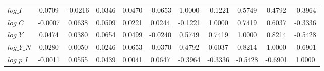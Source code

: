 \begin{center}
\begin{longtable}{lcccccccccc}
$log\_I          $	 & 	            0.0709	 & 	           -0.0216	 & 	            0.0346	 & 	            0.0470	 & 	           -0.0653	 & 	            1.0000	 & 	           -0.1221	 & 	            0.5749	 & 	            0.4792	 & 	           -0.3964 \\ 
$log\_C          $	 & 	           -0.0007	 & 	            0.0638	 & 	            0.0509	 & 	            0.0221	 & 	            0.0244	 & 	           -0.1221	 & 	            1.0000	 & 	            0.7419	 & 	            0.6037	 & 	           -0.3336 \\ 
$log\_Y          $	 & 	            0.0474	 & 	            0.0380	 & 	            0.0654	 & 	            0.0499	 & 	           -0.0240	 & 	            0.5749	 & 	            0.7419	 & 	            1.0000	 & 	            0.8214	 & 	           -0.5428 \\ 
$log\_Y\_N       $	 & 	            0.0280	 & 	            0.0050	 & 	            0.0246	 & 	            0.0653	 & 	           -0.0370	 & 	            0.4792	 & 	            0.6037	 & 	            0.8214	 & 	            1.0000	 & 	           -0.6901 \\ 
$log\_p\_I       $	 & 	           -0.0011	 & 	            0.0555	 & 	            0.0439	 & 	            0.0041	 & 	            0.0647	 & 	           -0.3964	 & 	           -0.3336	 & 	           -0.5428	 & 	           -0.6901	 & 	            1.0000 \\ 
\end{longtable}
 \end{center}
